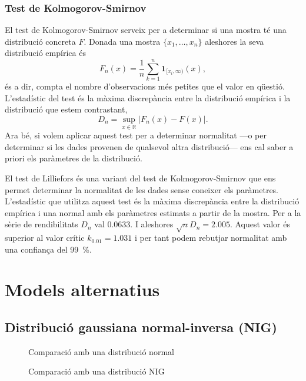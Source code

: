 \documentclass{article}
\numberwithin{table}{section}
\numberwithin{figure}{section}
\numberwithin{equation}{section}
\newcommand{\ind}{\ensuremath{\mathbf{1}}}
\newcommand{\R}{\ensuremath{\mathbb{R}}}
\newcommand{\abs}[1]{\ensuremath{\left\lvert #1 \right\rvert}}
\begin{document}
\subsubsection{Test de Kolmogorov-Smirnov}
El test de Kolmogorov-Smirnov serveix per a determinar si una mostra té una distribució concreta \( F \). Donada una mostra \( \{x_1, \dots, x_n \} \) aleshores la seva distribució empírica és
\begin{equation*}
	F_n(x) = \frac{1}{n} \sum_{k = 1}^{n} \ind_{[x_i, \infty)}(x),
\end{equation*}
és a dir, compta el nombre d'observacions més petites que el valor en qüestió. L'estadístic del test és la màxima discrepància entre la distribució empírica i la distribució que estem contrastant,
\begin{equation*}
	D_n = \sup_{x \in \R} \abs{F_n(x) - F(x)}.
\end{equation*}
Ara bé, si volem aplicar aquest test per a determinar normalitat ---o per determinar si les dades provenen de qualsevol altra distribució--- ens cal saber a priori els paràmetres de la distribució. 

El test de Lilliefors és una variant del test de Kolmogorov-Smirnov que ens permet determinar la normalitat de les dades sense coneixer els paràmetres. L'estadístic que utilitza aquest test és la màxima discrepància entre la distribució empírica i una normal amb els paràmetres estimats a partir de la mostra. Per a la sèrie de rendibilitats \( D_n \) val \num{0.0633}. I aleshores \( \sqrt{n}D_n = 2.005 \). Aquest valor és superior al valor crític \( k_{0.01} = 1.031 \) i per tant podem rebutjar normalitat amb una confiança del \SI{99}{\percent}.

\section{Models alternatius}
\subsection{Distribució gaussiana normal-inversa (NIG)}
\begin{figure}[htb]
	\centering \sffamily \small
	
	\caption{Comparació amb una distribució normal}
	\label{fig:comparacio normal}
\end{figure}
\begin{figure}[htb]
	\centering \sffamily \small
	
	\caption{Comparació amb una distribució NIG}
	\label{fig:comparacio nig}
\end{figure}
\end{document}
